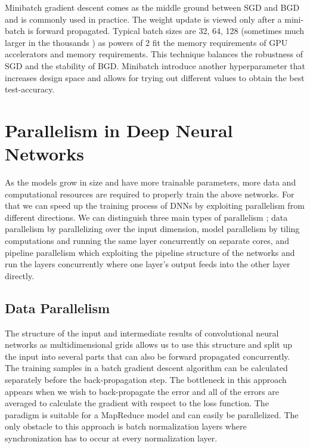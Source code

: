 Minibatch gradient descent comes as the middle ground between SGD and BGD and is commonly used in practice. The weight update is viewed only after a mini-batch is forward propagated. Typical batch sizes are 32, 64, 128 (sometimes much larger in the thousands )  as powers of 2 fit the memory requirements of GPU accelerators and memory requirements. This technique balances the robustness of SGD and the stability of BGD. Minibatch introduce another hyperparameter that increases design space and allows for trying out different values to obtain the best test-accuracy.


\section{Parallelism in Deep Neural Networks}
As the models grow in size and have more trainable parameters, more data and computational resources are required to properly train the above networks. For that we can speed up the training process of DNNs by exploiting parallelism from different directions. We can distinguish three main types of parallelism \cite{ddl}; data parallelism by parallelizing over the input dimension, model parallelism by tiling computations and running the same layer concurrently on separate cores, and pipeline parallelism which exploiting the pipeline structure of the networks and run the layers concurrently where one layer’s output feeds into the other layer directly. 

\subsection{Data Parallelism}
The structure of the input and intermediate results of convolutional neural networks as multidimensional grids allows us to use this structure and split up the input into several parts that can also be forward propagated concurrently. The training samples in a batch gradient descent algorithm can be calculated separately before the back-propagation step. The bottleneck in this approach appears when we wish to back-propagate the error and all of the errors are averaged to calculate the gradient with respect to the loss function. The paradigm is suitable for a MapReduce model and can easily be parallelized. The only obstacle to this approach is batch normalization layers where synchronization has to occur at every normalization layer. 

